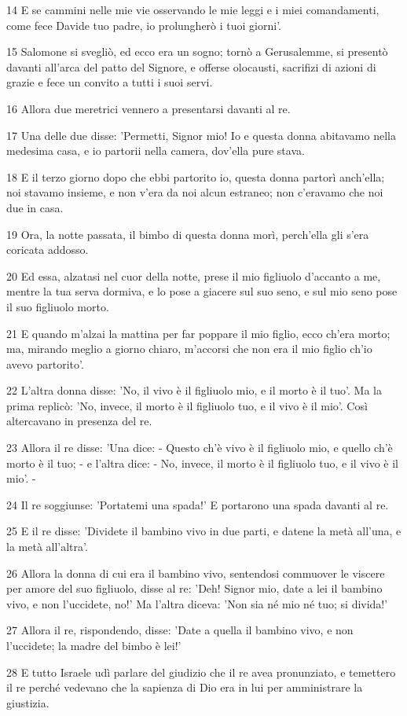 \par 14 E se cammini nelle mie vie osservando le mie leggi e i miei comandamenti, come fece Davide tuo padre, io prolungherò i tuoi giorni'.
\par 15 Salomone si svegliò, ed ecco era un sogno; tornò a Gerusalemme, si presentò davanti all'arca del patto del Signore, e offerse olocausti, sacrifizi di azioni di grazie e fece un convito a tutti i suoi servi.
\par 16 Allora due meretrici vennero a presentarsi davanti al re.
\par 17 Una delle due disse: 'Permetti, Signor mio! Io e questa donna abitavamo nella medesima casa, e io partorii nella camera, dov'ella pure stava.
\par 18 E il terzo giorno dopo che ebbi partorito io, questa donna partorì anch'ella; noi stavamo insieme, e non v'era da noi alcun estraneo; non c'eravamo che noi due in casa.
\par 19 Ora, la notte passata, il bimbo di questa donna morì, perch'ella gli s'era coricata addosso.
\par 20 Ed essa, alzatasi nel cuor della notte, prese il mio figliuolo d'accanto a me, mentre la tua serva dormiva, e lo pose a giacere sul suo seno, e sul mio seno pose il suo figliuolo morto.
\par 21 E quando m'alzai la mattina per far poppare il mio figlio, ecco ch'era morto; ma, mirando meglio a giorno chiaro, m'accorsi che non era il mio figlio ch'io avevo partorito'.
\par 22 L'altra donna disse: 'No, il vivo è il figliuolo mio, e il morto è il tuo'. Ma la prima replicò: 'No, invece, il morto è il figliuolo tuo, e il vivo è il mio'. Così altercavano in presenza del re.
\par 23 Allora il re disse: 'Una dice: - Questo ch'è vivo è il figliuolo mio, e quello ch'è morto è il tuo; - e l'altra dice: - No, invece, il morto è il figliuolo tuo, e il vivo è il mio'. -
\par 24 Il re soggiunse: 'Portatemi una spada!' E portarono una spada davanti al re.
\par 25 E il re disse: 'Dividete il bambino vivo in due parti, e datene la metà all'una, e la metà all'altra'.
\par 26 Allora la donna di cui era il bambino vivo, sentendosi commuover le viscere per amore del suo figliuolo, disse al re: 'Deh! Signor mio, date a lei il bambino vivo, e non l'uccidete, no!' Ma l'altra diceva: 'Non sia né mio né tuo; si divida!'
\par 27 Allora il re, rispondendo, disse: 'Date a quella il bambino vivo, e non l'uccidete; la madre del bimbo è lei!'
\par 28 E tutto Israele udì parlare del giudizio che il re avea pronunziato, e temettero il re perché vedevano che la sapienza di Dio era in lui per amministrare la giustizia.

